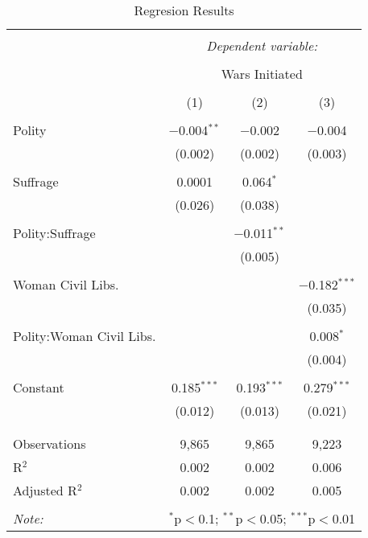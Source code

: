
\begin{table}[!htbp] \centering 
  \caption{Regresion Results} 
  \label{} 
\begin{tabular}{@{\extracolsep{5pt}}lccc} 
\\[-1.8ex]\hline 
\hline \\[-1.8ex] 
 & \multicolumn{3}{c}{\textit{Dependent variable:}} \\ 
\cline{2-4} 
\\[-1.8ex] & \multicolumn{3}{c}{Wars Initiated} \\ 
\\[-1.8ex] & (1) & (2) & (3)\\ 
\hline \\[-1.8ex] 
 Polity & $-$0.004$^{**}$ & $-$0.002 & $-$0.004 \\ 
  & (0.002) & (0.002) & (0.003) \\ 
  & & & \\ 
 Suffrage & 0.0001 & 0.064$^{*}$ &  \\ 
  & (0.026) & (0.038) &  \\ 
  & & & \\ 
 Polity:Suffrage &  & $-$0.011$^{**}$ &  \\ 
  &  & (0.005) &  \\ 
  & & & \\ 
 Woman Civil Libs. &  &  & $-$0.182$^{***}$ \\ 
  &  &  & (0.035) \\ 
  & & & \\ 
 Polity:Woman Civil Libs. &  &  & 0.008$^{*}$ \\ 
  &  &  & (0.004) \\ 
  & & & \\ 
 Constant & 0.185$^{***}$ & 0.193$^{***}$ & 0.279$^{***}$ \\ 
  & (0.012) & (0.013) & (0.021) \\ 
  & & & \\ 
\hline \\[-1.8ex] 
Observations & 9,865 & 9,865 & 9,223 \\ 
R$^{2}$ & 0.002 & 0.002 & 0.006 \\ 
Adjusted R$^{2}$ & 0.002 & 0.002 & 0.005 \\ 
\hline 
\hline \\[-1.8ex] 
\textit{Note:}  & \multicolumn{3}{r}{$^{*}$p$<$0.1; $^{**}$p$<$0.05; $^{***}$p$<$0.01} \\ 
\end{tabular} 
\end{table} 
